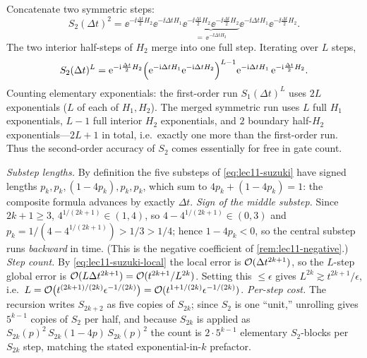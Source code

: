 \begin{solution}
Concatenate two symmetric steps:
\[
  S_2(\Delta t)^2=\ee^{-\ii\frac{\Delta t}{2}H_2}\ee^{-\ii\Delta t H_1}
    \underbrace{\ee^{-\ii\frac{\Delta t}{2}H_2}\ee^{-\ii\frac{\Delta t}{2}H_2}}
    _{=\,\ee^{-\ii\Delta t H_2}}\ee^{-\ii\Delta t H_1}\ee^{-\ii\frac{\Delta t}{2}H_2}.
\]
The two interior half-steps of $H_2$ merge into one full step. Iterating over $L$ steps,
\[
  S_2(\Delta t)^L=\mathrm{e}^{-\mathrm{i}\frac{\Delta t}{2}H_2}
    \Bigl(\mathrm{e}^{-\mathrm{i}\Delta t H_1}\mathrm{e}^{-\mathrm{i}\Delta t H_2}\Bigr)^{L-1}
    \mathrm{e}^{-\mathrm{i}\Delta t H_1}\,\mathrm{e}^{-\mathrm{i}\frac{\Delta t}{2}H_2}.
\]
Counting elementary exponentials: the first-order run $S_1(\Delta t)^L$ uses $2L$
exponentials ($L$ of each of $H_1,H_2$). The merged symmetric run uses $L$ full $H_1$
exponentials, $L-1$ full interior $H_2$ exponentials, and $2$ boundary half-$H_2$
exponentials---$2L+1$ in total, i.e.\ exactly one more than the first-order run. Thus the
second-order accuracy of $S_2$ comes essentially for free in gate count.
\end{solution}

\begin{solution}
\emph{Substep lengths.} By definition the five substeps of \eqref{eq:lec11-suzuki} have
signed lengths $p_k,p_k,(1-4p_k),p_k,p_k$, which sum to
$4p_k+(1-4p_k)=1$: the composite formula advances by exactly $\Delta t$.
\emph{Sign of the middle substep.} Since $2k+1\ge3$, $4^{1/(2k+1)}\in(1,4)$, so
$4-4^{1/(2k+1)}\in(0,3)$ and $p_k=1/(4-4^{1/(2k+1)})>1/3>1/4$; hence $1-4p_k<0$, so the
central substep runs \emph{backward} in time. (This is the negative coefficient of
\cref{rem:lec11-negative}.) \emph{Step count.} By \eqref{eq:lec11-suzuki-local} the local
error is $\mathcal{O}(\Delta t^{2k+1})$, so the $L$-step global error is
$\mathcal{O}(L\Delta t^{2k+1})=\mathcal{O}(t^{2k+1}/L^{2k})$. Setting this $\le\epsilon$ gives
$L^{2k}\gtrsim t^{2k+1}/\epsilon$, i.e.\
$L=\mathcal{O}\bigl(t^{(2k+1)/(2k)}\epsilon^{-1/(2k)}\bigr)
=\mathcal{O}(t^{1+1/(2k)}\epsilon^{-1/(2k)})$. \emph{Per-step cost.} The recursion writes
$S_{2k+2}$ as five copies of $S_{2k}$; since $S_2$ is one ``unit,'' unrolling gives
$5^{k-1}$ copies of $S_2$ per half, and because $S_{2k}$ is applied as
$S_{2k}(p)^2\,S_{2k}(1-4p)\,S_{2k}(p)^2$ the count is $2\cdot5^{k-1}$ elementary
$S_2$-blocks per $S_{2k}$ step, matching the stated exponential-in-$k$ prefactor.
\end{solution}


